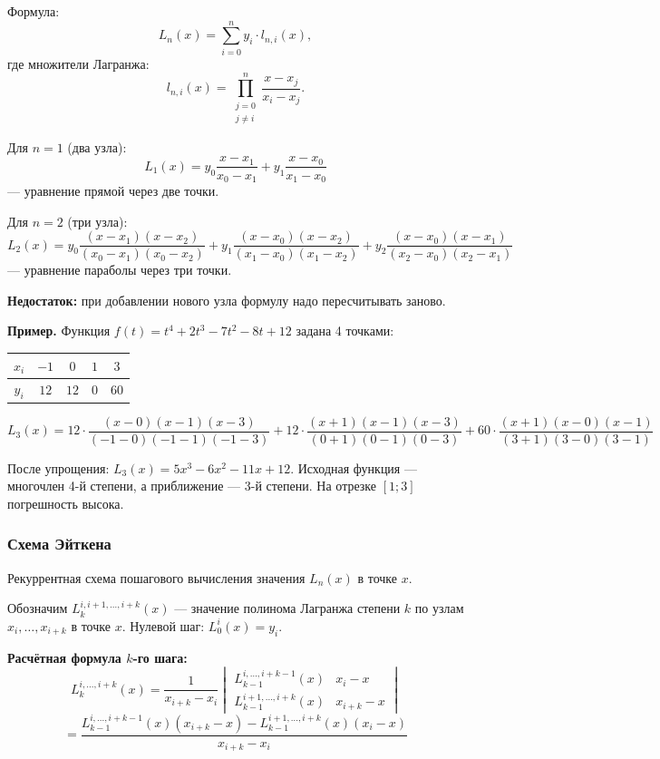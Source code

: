 \documentclass[14pt,a4paper]{extarticle}
\begin{document}
Формула:
\[L_n(x) = \sum_{i=0}^{n} y_i \cdot l_{n,i}(x),\]
где множители Лагранжа:
\[l_{n,i}(x) = \prod_{\substack{j=0 \\ j \neq i}}^{n} \frac{x - x_j}{x_i - x_j}.\]

Для $n = 1$ (два узла):
\[L_1(x) = y_0 \frac{x - x_1}{x_0 - x_1} + y_1 \frac{x - x_0}{x_1 - x_0}\]
--- уравнение прямой через две точки.

Для $n = 2$ (три узла):
\[L_2(x) = y_0 \frac{(x-x_1)(x-x_2)}{(x_0-x_1)(x_0-x_2)} + y_1 \frac{(x-x_0)(x-x_2)}{(x_1-x_0)(x_1-x_2)} + y_2 \frac{(x-x_0)(x-x_1)}{(x_2-x_0)(x_2-x_1)}\]
--- уравнение параболы через три точки.

\textbf{Недостаток:} при добавлении нового узла формулу надо пересчитывать заново.

\textbf{Пример.} Функция $f(t) = t^4 + 2t^3 - 7t^2 - 8t + 12$ задана 4 точками:

\begin{center}
\begin{tabular}{c|c|c|c|c}
\toprule
$x_i$ & $-1$ & $0$ & $1$ & $3$ \\
\midrule
$y_i$ & $12$ & $12$ & $0$ & $60$ \\
\bottomrule
\end{tabular}
\end{center}

\[L_3(x) = 12 \cdot \frac{(x-0)(x-1)(x-3)}{(-1-0)(-1-1)(-1-3)} + 12 \cdot \frac{(x+1)(x-1)(x-3)}{(0+1)(0-1)(0-3)} + 60 \cdot \frac{(x+1)(x-0)(x-1)}{(3+1)(3-0)(3-1)}\]

После упрощения: $L_3(x) = 5x^3 - 6x^2 - 11x + 12$. Исходная функция --- многочлен 4-й степени, а приближение --- 3-й степени. На отрезке $[1; 3]$ погрешность высока.

\subsubsection{Схема Эйткена}

Рекуррентная схема пошагового вычисления значения $L_n(x)$ в точке $x$.

Обозначим $L_k^{i, i+1, \ldots, i+k}(x)$ --- значение полинома Лагранжа степени $k$ по узлам $x_i, \ldots, x_{i+k}$ в точке $x$. Нулевой шаг: $L_0^i(x) = y_i$.

\textbf{Расчётная формула $k$-го шага:}
\[L_k^{i, \ldots, i+k}(x) = \frac{1}{x_{i+k} - x_i} \begin{vmatrix} L_{k-1}^{i, \ldots, i+k-1}(x) & x_i - x \\ L_{k-1}^{i+1, \ldots, i+k}(x) & x_{i+k} - x \end{vmatrix}\]
\[= \frac{L_{k-1}^{i, \ldots, i+k-1}(x)(x_{i+k} - x) - L_{k-1}^{i+1, \ldots, i+k}(x)(x_i - x)}{x_{i+k} - x_i}\]
\end{document}
